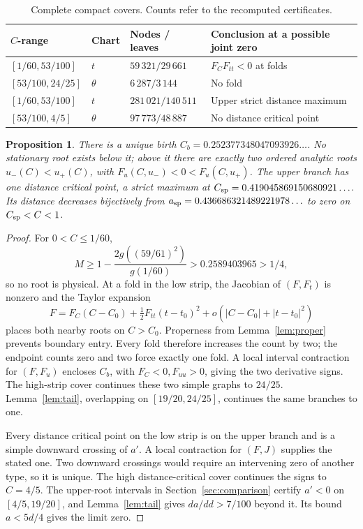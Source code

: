 \documentclass[12pt,letterpaper,onecolumn]{article}
\newtheorem{proposition}[theorem]{Proposition}
\theoremstyle{definition}
\begin{document}
\begin{table}[t]
\centering
\caption{Complete compact covers. Counts refer to the recomputed certificates.}
\label{tab:covers}
\begin{tabular}{llll}
\toprule
\(C\)-range & Chart & Nodes / leaves & Conclusion at a possible joint zero\\
\midrule
\([1/60,53/100]\)&\(t\)&\(59\,321/29\,661\)&\(F_CF_{tt}<0\) at folds\\
\([53/100,24/25]\)&\(\theta\)&\(6\,287/3\,144\)&No fold\\
\([1/60,53/100]\)&\(t\)&\(281\,021/140\,511\)&Upper strict distance maximum\\
\([53/100,4/5]\)&\(\theta\)&\(97\,773/48\,887\)&No distance critical point\\
\bottomrule
\end{tabular}
\end{table}

\begin{proposition}\label{prop:branches}
There is a unique birth \(C_b=0.252377348047093926\ldots\).
No stationary root exists below it; above it there are exactly two ordered analytic roots \(u_-(C)<u_+(C)\), with \(F_u(C,u_-)<0<F_u(C,u_+)\).
The upper branch has one distance critical point, a strict maximum at
\(C_{\rm sp}=0.419045869150680921\ldots\).
Its distance decreases bijectively from
\(a_{\rm sp}=0.436686321489221978\ldots\) to zero on \(C_{\rm sp}<C<1\).
\end{proposition}
\begin{proof}
For \(0<C\le1/60\),
\[
M\ge1-\frac{2g((59/61)^2)}{g(1/60)}
>0.2589403965>1/4,
\]
so no root is physical.
At a fold in the low strip, the Jacobian of \((F,F_t)\) is nonzero and the Taylor expansion
\[
F=F_C(C-C_0)+\tfrac12F_{tt}(t-t_0)^2+o(|C-C_0|+|t-t_0|^2)
\]
places both nearby roots on \(C>C_0\).
Properness from Lemma~\ref{lem:proper} prevents boundary entry.
Every fold therefore increases the count by two; the endpoint counts zero and two force exactly one fold.
A local interval contraction for \((F,F_u)\) encloses \(C_b\), with \(F_C<0,F_{uu}>0\), giving the two derivative signs.
The high-strip cover continues these two simple graphs to \(24/25\).
Lemma~\ref{lem:tail}, overlapping on \([19/20,24/25]\), continues the same branches to one.

Every distance critical point on the low strip is on the upper branch and is a simple downward crossing of \(a'\).
A local contraction for \((F,J)\) supplies the stated one. Two downward crossings would require an intervening zero of another type, so it is unique.
The high distance-critical cover continues the signs to \(C=4/5\).
The upper-root intervals in Section~\ref{sec:comparison} certify \(a'<0\) on \([4/5,19/20]\), and Lemma~\ref{lem:tail} gives \(da/dd>7/100\) beyond it.
Its bound \(a<5d/4\) gives the limit zero.
\end{proof}
\end{document}
